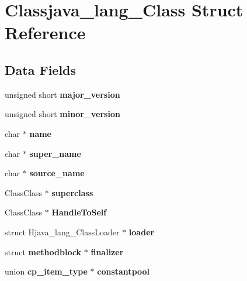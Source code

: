 \section{Classjava\_\-lang\_\-Class Struct Reference}
\label{struct_classjava__lang___class}
\subsection*{Data Fields}
\begin{DoxyCompactItemize}
\item 
unsigned short {\bfseries major\_\-version}\label{struct_classjava__lang___class_a5ac0f8104616f28dca4453eb770b813d}

\item 
unsigned short {\bfseries minor\_\-version}\label{struct_classjava__lang___class_ae9fbb14840f2e288603aae832d326faa}

\item 
char $\ast$ {\bfseries name}\label{struct_classjava__lang___class_a0714895eb96ffb5aac68b1b6f308b2ad}

\item 
char $\ast$ {\bfseries super\_\-name}\label{struct_classjava__lang___class_a5baba2838a782dbb597e109c935d1838}

\item 
char $\ast$ {\bfseries source\_\-name}\label{struct_classjava__lang___class_a44b974fff00a1ebfa1257a5630f20637}

\item 
ClassClass $\ast$ {\bfseries superclass}\label{struct_classjava__lang___class_ad46b1c52675421838c379b5d91fbaab7}

\item 
ClassClass $\ast$ {\bfseries HandleToSelf}\label{struct_classjava__lang___class_a71435bfc074c47a5a0c107740ad6a1cb}

\item 
struct Hjava\_\-lang\_\-ClassLoader $\ast$ {\bfseries loader}\label{struct_classjava__lang___class_aad9e67cd8f017de5751c2c3ee88ab85c}

\item 
struct {\bf methodblock} $\ast$ {\bfseries finalizer}\label{struct_classjava__lang___class_ab7d58c1bbd46e18153ec6f09e328f097}

\item 
union {\bf cp\_\-item\_\-type} $\ast$ {\bfseries constantpool}\label{struct_classjava__lang___class_a1530a821d7834e5d0120cc6f999f5214}


\end{DoxyCompactItemize}
